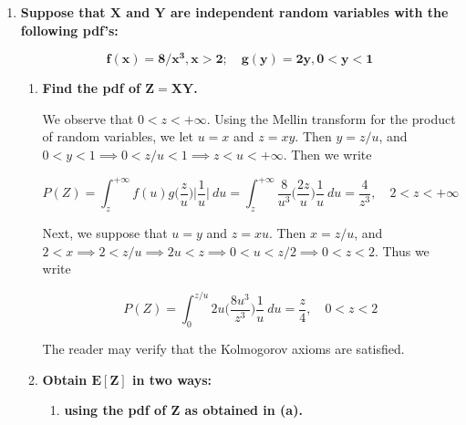 \documentclass[10pt, oneside]{article}
\begin{document}
\begin{enumerate}[label=7.\arabic*]
\begin{enumerate}
	The reader may verify that the aforementioned values of $k$ lead to expectations of 51.6, 53.6, and 52, respectively. Therefore, all are inferior to individual testing (requiring 50 tests).
	\end{enumerate}

\item  \begin{tcolorbox}[
  colback=Cerulean!5!white,
  colframe=Cerulean!75!black]
  \textbf{Suppose that $\bm{X}$ and $\bm{Y}$ are independent random variables with the following pdf's:}
  
  \[ \bm{f(x) = 8/x^3, x > 2; \quad g(y) = 2y, 0 < y < 1} \]
\end{tcolorbox}

	\begin{enumerate}
	\item  \begin{tcolorbox}[
	  colback=Cerulean!5!white,
	  colframe=Cerulean!75!black]
	\textbf{Find the pdf of $\bm{Z = XY}$.}
	\end{tcolorbox}
	
	We observe that $0 < z < +\infty$. Using the Mellin transform for the product of random variables, we let $u = x$ and $z = xy$. Then $y = z/u$, and $0 < y < 1  \implies 0 < z/u < 1 \implies z < u < + \infty$. Then we write
	
	\[ P(Z) = \int^{+\infty}_{z} f(u) g \Big( \frac{z}{u} \Big) \Big| \frac{1}{u} \Big| \ du = \int^{+\infty}_{z} \frac{8}{u^3} \Big( \frac{2z}{u} \Big) \frac{1}{u} \ du = \boxed{ \frac{4}{z^3}, \quad 2 < z < +\infty} \]
	
	Next, we suppose that $u = y$ and $z = xu$. Then $x = z/u$, and $2 < x \implies 2 < z/u \implies 2u < z \implies 0 < u < z/2 \implies 0 < z < 2$. Thus we write
	
	\[ P(Z) = \int^{z/u}_0 2u \Big( \frac{8u^3}{z^3} \Big) \frac{1}{u} \ du = \boxed{\frac{z}{4}, \quad 0 < z < 2} \]
	
	The reader may verify that the Kolmogorov axioms are satisfied.
	
	\item  \begin{tcolorbox}[
	  colback=Cerulean!5!white,
	  colframe=Cerulean!75!black]
	\textbf{Obtain $\bm{E[Z]}$ in two ways:}
	\end{tcolorbox}
	
		\begin{enumerate}
		\item  \begin{tcolorbox}[
		  colback=Cerulean!5!white,
		  colframe=Cerulean!75!black]
		\textbf{using the pdf of $\bm{Z}$ as obtained in (a).}
		\end{tcolorbox}
		

\end{enumerate}
\end{enumerate}
\end{enumerate}
\end{document}
